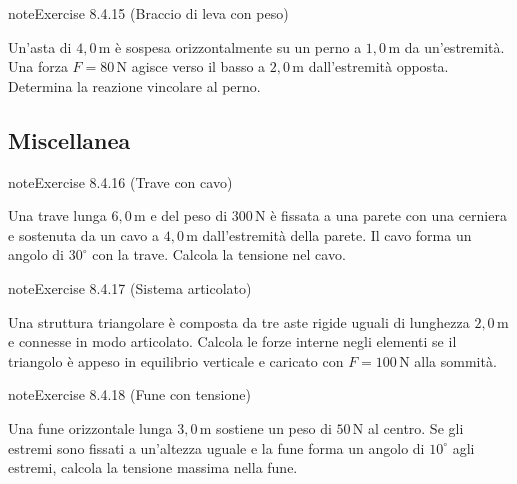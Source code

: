 \documentclass[letterpaper,10pt,italian]{jupyterBook}
\begin{document}
\begin{sphinxadmonition}{note}{Exercise 8.4.15 (Braccio di leva con peso)}



\sphinxAtStartPar
Un’asta di \(4,0 \, \text{m}\) è sospesa orizzontalmente su un perno a \(1,0 \, \text{m}\) da un’estremità. Una forza \(F = 80 \, \text{N}\) agisce verso il basso a \(2,0 \, \text{m}\) dall’estremità opposta. Determina la reazione vincolare al perno.
\end{sphinxadmonition}


\subsection{Miscellanea}
\label{\detokenize{ch/mechanics/statics-problems:miscellanea}} \label{exercise:ch/mechanics/statics-problems-exercise-15}

\begin{sphinxadmonition}{note}{Exercise 8.4.16 (Trave con cavo)}



\sphinxAtStartPar
Una trave lunga \(6,0 \, \text{m}\) e del peso di \(300 \, \text{N}\) è fissata a una parete con una cerniera e sostenuta da un cavo a \(4,0 \, \text{m}\) dall’estremità della parete. Il cavo forma un angolo di \(30^\circ\) con la trave. Calcola la tensione nel cavo.
\end{sphinxadmonition}
 \label{exercise:ch/mechanics/statics-problems-exercise-16}

\begin{sphinxadmonition}{note}{Exercise 8.4.17 (Sistema articolato)}



\sphinxAtStartPar
Una struttura triangolare è composta da tre aste rigide uguali di lunghezza \(2,0 \, \text{m}\) e connesse in modo articolato. Calcola le forze interne negli elementi se il triangolo è appeso in equilibrio verticale e caricato con \(F = 100 \, \text{N}\) alla sommità.
\end{sphinxadmonition}
 \label{exercise:ch/mechanics/statics-problems-exercise-17}

\begin{sphinxadmonition}{note}{Exercise 8.4.18 (Fune con tensione)}



\sphinxAtStartPar
Una fune orizzontale lunga \(3,0 \, \text{m}\) sostiene un peso di \(50 \, \text{N}\) al centro. Se gli estremi sono fissati a un’altezza uguale e la fune forma un angolo di \(10^\circ\) agli estremi, calcola la tensione massima nella fune.
\end{sphinxadmonition}
 \label{exercise:ch/mechanics/statics-problems-exercise-18}
\end{document}
